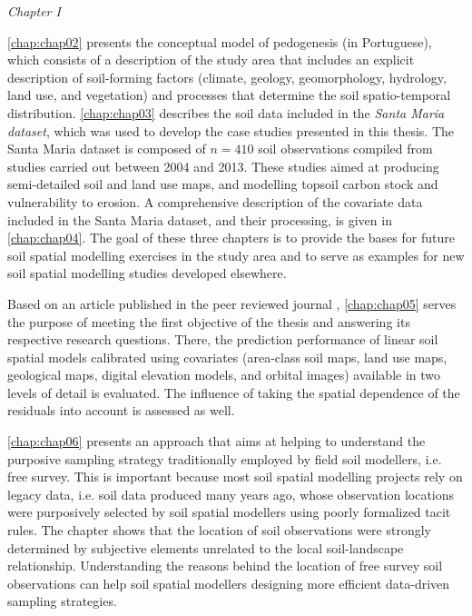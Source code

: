 \emph{Chapter I}

\autoref{chap:chap02} presents the conceptual model of pedogenesis (in Portuguese), which consists of a 
description of the study area that includes an explicit description of soil-forming factors (climate, geology, 
geomorphology, hydrology, land use, and vegetation) and processes that determine the soil spatio-temporal 
distribution. \autoref{chap:chap03} describes the soil data included in the \emph{Santa Maria dataset}, which 
was used to develop the case studies presented in this thesis. The Santa Maria dataset is composed of 
$n = 410$ soil observations compiled from studies carried out between \num{2004} and \num{2013}. These studies 
aimed at producing semi-detailed soil and land use maps, and modelling topsoil carbon stock and vulnerability 
to erosion. A comprehensive description of the covariate data included in the Santa Maria dataset, and their 
processing, is given in \autoref{chap:chap04}. The goal of these three chapters is to provide the bases for 
future soil spatial modelling exercises in the study area and to serve as examples for new soil spatial 
modelling studies developed elsewhere.

Based on an article published in the peer reviewed journal \geoderma, \autoref{chap:chap05} serves the purpose 
of meeting the first objective of the thesis and answering its respective research questions. There, the 
prediction performance of linear soil spatial models calibrated using covariates (area-class soil maps, land 
use maps, geological maps, digital elevation models, and orbital images) available in two levels of detail is 
evaluated. The influence of taking the spatial dependence of the residuals into account is assessed as well. 

\autoref{chap:chap06} presents an approach that aims at helping to understand the purposive sampling strategy 
traditionally employed by field soil modellers, i.e. free survey. This is important because most soil 
spatial modelling projects rely on legacy data, i.e. soil data produced many years ago, whose observation 
locations were purposively selected by soil spatial modellers using poorly formalized tacit rules. The chapter 
shows that the location of soil observations were strongly determined by subjective elements unrelated to the 
local soil-landscape relationship. Understanding the reasons behind the location of free survey soil 
observations can help soil spatial modellers designing more efficient data-driven sampling strategies.

